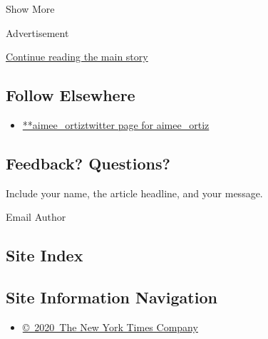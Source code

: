 Show More

Advertisement

\protect\hyperlink{after-mid2}{Continue reading the main story}

\hypertarget{follow-elsewhere}{%
\subsection{Follow Elsewhere}\label{follow-elsewhere}}

\begin{itemize}
\tightlist
\item
  \href{https://twitter.com/aimee_ortiz}{**aimee\_ortiztwitter page for
  aimee\_ortiz}
\end{itemize}

\hypertarget{feedback-questions}{%
\subsection{Feedback? Questions?}\label{feedback-questions}}

Include your name, the article headline, and your message.

Email Author

\hypertarget{site-index}{%
\subsection{Site Index}\label{site-index}}

\hypertarget{site-information-navigation}{%
\subsection{Site Information
Navigation}\label{site-information-navigation}}

\begin{itemize}
\tightlist
\item
  \href{https://help.nytimes3xbfgragh.onion/hc/en-us/articles/115014792127-Copyright-notice}{©~2020~The
  New York Times Company}
\end{itemize}

